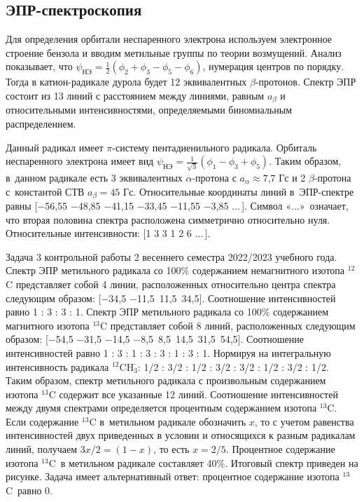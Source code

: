 \subsection{ЭПР-спектроскопия}
 Для определения орбитали неспаренного электрона используем электронное строение бензола и вводим метильные группы по теории возмущений. Анализ показывает, что $\psi_{\text{НЭ}} = \frac{1}{2}\left( \phi_2 +\phi_3 -\phi_5 -\phi_6 \right)$, нумерация центров по порядку. Тогда в катион-радикале дурола будет 12 эквивалентных $\beta$-протонов. Спектр ЭПР состоит из 13 линий с расстоянием между линиями, равным $a_{\beta}$ и относительными интенсивностями, определяемыми биномиальным распределением.\par
{} Данный радикал имеет $\pi$-систему пентадиенильного радикала. Орбиталь неспаренного электрона имеет вид $\psi_{\text{НЭ}} = \frac{1}{\sqrt3}\left( \phi_1 -\phi_3 +\phi_5 \right)$. Таким образом, в~данном радикале есть 3 эквивалентных $\alpha$-протона с $a_{\alpha} \approx \text{7,7}$ Гс и 2 $\beta$-протона с~константой СТВ $a_{\beta} = \text{45}$ Гс. Относительные координаты линий в~ЭПР-спектре равны [$-$56,55 $-$48,85 $-$41,15 $-$33,45 $-$11,55 $-$3,85 $\ldots\,$]. Символ «$\ldots$»$\,$ означает, что вторая половина спектра расположена симметрично относительно нуля. Относительные интенсивности: [1 3 3 1 2 6 $\ldots\,$].\par
{} Задача 3 контрольной работы 2 весеннего семестра 2022/2023 учебного года. Спектр ЭПР метильного радикала со 100\% содержанием немагнитного изотопа $^{12}$C представляет собой 4 линии, расположенных относительно центра спектра следующим образом: [$-$34,5 $-$11,5 $\,$11,5 $\,$34,5]. Соотношение интенсивностей равно 1 : 3 : 3 : 1. Спектр ЭПР метильного радикала со 100\% содержанием магнитного изотопа $^{13}$C представляет собой 8 линий, расположенных следующим образом: [$-$54,5 $-$31,5 $-$14,5 $-$8,5 $\,$8,5 $\,$14,5 $\,$31,5 $\,$54,5]. Соотношение интенсивностей равно 1 : 3 : 1 : 3 : 3 : 1 : 3 : 1. Нормируя на интегральную интенсивность радикала $^{12}\text{CH}_3^{\boldsymbol{\cdot}}$: 1/2 : 3/2 : 1/2 : 3/2 : 3/2 : 1/2 : 3/2 : 1/2. Таким образом, спектр метильного радикала с произвольным содержанием изотопа $^{13}$C содержит все указанные 12 линий. Соотношение интенсивностей между двумя спектрами определяется процентным содержанием изотопа $^{13}$C. Если содержание $^{13}$C в~метильном радикале обозначить $x$, то с учетом равенства интенсивностей двух приведенных в условии и относящихся к разным радикалам линий, получаем $3x/2 = (1 - x)$, то есть $x = 2/5$. Процентное содержание изотопа $^{13}$C~в метильном радикале составляет 40\%. Итоговый спектр приведен на рисунке. Задача имеет альтернативный ответ: процентное содержание изотопа $^{13}$C~равно 0.\par
